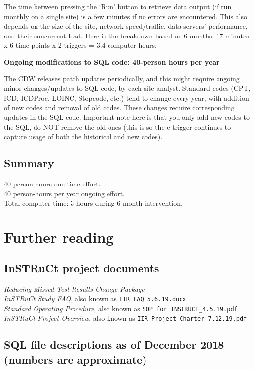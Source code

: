 \documentclass{article}
\begin{document}
The time between pressing the `Run' button to retrieve data output (if
run monthly on a single site) is a few minutes if no errors are
encountered. This also depends on the size of the site, network
speed/traffic, data servers' performance, and their concurrent load.
Here is the breakdown based on 6 months: 17 minutes x 6 time points x
2 triggers = 3.4 computer hours.

\noindent\textbf{Ongoing modifications to SQL code: 40-person hours
  per year}

The CDW releases patch updates periodically, and this might require
ongoing minor changes/updates to SQL code, by each site analyst.
Standard codes (CPT, ICD, ICDProc, LOINC, Stopcode, etc.) tend to
change every year, with addition of new codes and removal of old
codes. These changes require corresponding updates in the SQL code.
Important note here is that you only add new codes to the SQL, do NOT
remove the old ones (this is so the e-trigger continues to capture
usage of both the historical and new codes).

\subsection{Summary}

40 person-hours one-time effort.\\
40 person-hours per year ongoing effort.\\
Total computer time: 3 hours during 6 month intervention.




\section{Further reading}

\subsection{InSTRuCt project documents}

\emph{Reducing Missed Test Results Change Package}\\
\emph{InSTRuCt Study FAQ}, also known as \texttt{IIR FAQ 5.6.19.docx}\\
\emph{Standard Operating Procedure}, also known as \texttt{SOP for
  INSTRUCT\_4.5.19.pdf}\\
\emph{InSTRuCt Project Overview}, also known as \texttt{IIR Project
  Charter\_7.12.19.pdf}

\subsection{SQL file descriptions as of December 2018 (numbers are approximate)}
\end{document}
